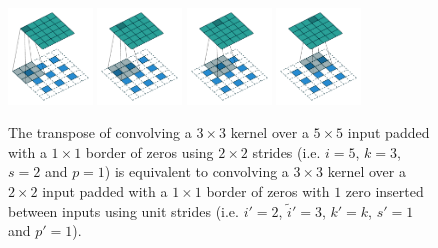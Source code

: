 \documentclass{article}
\begin{document}
\begin{figure}[t]
    \centering
    \includegraphics[width=0.2\textwidth]{pdf/padding_strides_transposed_00.pdf}
    \includegraphics[width=0.2\textwidth]{pdf/padding_strides_transposed_01.pdf}
    \includegraphics[width=0.2\textwidth]{pdf/padding_strides_transposed_02.pdf}
    \includegraphics[width=0.2\textwidth]{pdf/padding_strides_transposed_03.pdf}
    \caption{\label{fig:padding_strides_transposed} The transpose of convolving
        a $3 \times 3$ kernel over a $5 \times 5$ input padded with a $1 \times
        1$ border of zeros using $2 \times 2$ strides (i.e. $i = 5$, $k = 3$, $s
        = 2$ and $p = 1$) is equivalent to convolving a $3 \times 3$ kernel over
        a $2 \times 2$ input padded with a $1 \times 1$ border of zeros with $1$
        zero inserted between inputs using unit strides (i.e. $i' = 2$,
        $\tilde{i}' = 3$, $k' = k$, $s' = 1$ and $p' = 1$).}
\end{figure}
\end{document}

